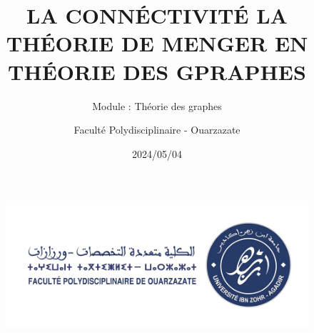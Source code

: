 \documentclass[10pt,hyperref={colorlinks,citecolor=blue,urlcolor=peking_blue,linkcolor=}]{beamer}
\author[FPO]{Faculté Polydisciplinaire - Ouarzazate}
\title{LA CONNÉCTIVITÉ LA THÉORIE DE MENGER EN THÉORIE DES GPRAPHES}
\subtitle{Module : Théorie des graphes}
\institute{Master Mathématiques Appliquées pour la Science des Données}
\date{
2024/05/04}
\theoremstyle{plain}
\newif\ifplacelogo %
\begin{document}
{
\begin{frame}
    \titlepage
    \begin{figure}[htpb]
        \begin{center}
            \includegraphics[width=0.7\linewidth]{Figures/fpo_logo.png}
        \end{center}
    \end{figure}
\end{frame}
}

\placelogofalse











\end{document}
